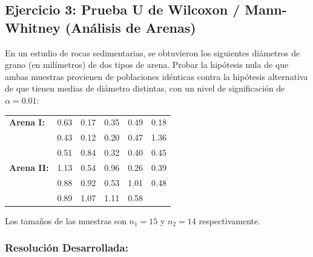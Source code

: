 \documentclass[11pt,a4paper]{article}
\begin{document}
\newpage
\subsection{Ejercicio 3: Prueba U de Wilcoxon / Mann-Whitney (Análisis de Arenas)} \label{ej:wilcoxon_u}

\begin{tcolorbox}[colback=white,colframe=blue!60!black,title=Enunciado]
    En un estudio de rocas sedimentarias, se obtuvieron los siguientes diámetros de grano (en milímetros) de dos tipos de arena. Probar la hipótesis nula de que ambas muestras provienen de poblaciones idénticas contra la hipótesis alternativa de que tienen medias de diámetro distintas, con un nivel de significación de $\alpha = 0.01$:
    \begin{center}\small
    \begin{tabular}{lrrrrr}
    \textbf{Arena I:} & 0.63 & 0.17 & 0.35 & 0.49 & 0.18 \\
                      & 0.43 & 0.12 & 0.20 & 0.47 & 1.36 \\
                      & 0.51 & 0.84 & 0.32 & 0.40 & 0.45 \\[2pt]
    \textbf{Arena II:}& 1.13 & 0.54 & 0.96 & 0.26 & 0.39 \\
                      & 0.88 & 0.92 & 0.53 & 1.01 & 0.48 \\
                      & 0.89 & 1.07 & 1.11 & 0.58 &
    \end{tabular}
    \end{center}
    Los tamaños de las muestras son $n_1 = 15$ y $n_2 = 14$ respectivamente.
\end{tcolorbox}

\subsubsection*{Resolución Desarrollada:}
\end{document}
